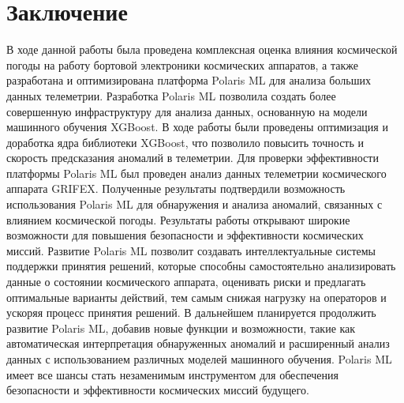 \documentclass[14pt, a4paper]{extreport}
\begin{document}
    \newpage

    \titleformat{\section}[block]{\large\bfseries\filcenter}{}{0em}{}
    \section{Заключение}

    В ходе данной работы была проведена комплексная оценка влияния космической погоды на работу бортовой электроники космических аппаратов, а также разработана и оптимизирована платформа Polaris ML для анализа больших данных телеметрии.
    Разработка Polaris ML позволила создать более совершенную инфраструктуру для анализа данных, основанную на модели машинного обучения XGBoost. В ходе работы были проведены оптимизация и доработка ядра библиотеки XGBoost, что позволило повысить точность и скорость предсказания аномалий в телеметрии.
    Для проверки эффективности платформы Polaris ML был проведен анализ данных телеметрии космического аппарата GRIFEX. Полученные результаты подтвердили возможность использования Polaris ML для обнаружения и анализа аномалий, связанных с влиянием космической погоды.
    Результаты работы открывают широкие возможности для повышения безопасности и эффективности космических миссий. Развитие Polaris ML позволит создавать интеллектуальные системы поддержки принятия решений, которые способны самостоятельно анализировать данные о состоянии космического аппарата, оценивать риски и предлагать оптимальные варианты действий, тем самым снижая нагрузку на операторов и ускоряя процесс принятия решений.
    В дальнейшем планируется продолжить развитие Polaris ML, добавив новые функции и возможности, такие как автоматическая интерпретация обнаруженных аномалий и расширенный анализ данных с использованием различных моделей машинного обучения. Polaris ML имеет все шансы стать незаменимым инструментом для обеспечения безопасности и эффективности космических миссий будущего.

    \newpage

    
    

    \newpage

    \appendix

    \titleformat{\section}[block]{\large\bfseries\filcenter}{}{0em}{}
    \titleformat{\subsection}[block]{\textnormal\bfseries}{}{0em}{}
\end{document}
